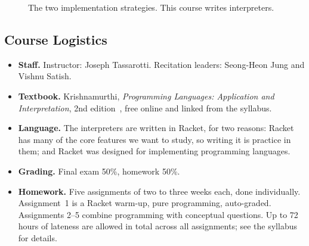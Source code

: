 \begin{figure}[htbp]
\centering
{}
\caption{The two implementation strategies. This course writes interpreters.}
\label{fig:implstrat}
\end{figure}

\subsection{Course Logistics}

\begin{itemize}
  \item \textbf{Staff.} Instructor: Joseph Tassarotti. Recitation leaders: Seong-Heon Jung and Vishnu Satish.
  \item \textbf{Textbook.} Krishnamurthi, \emph{Programming Languages: Application and Interpretation}, 2nd edition~\cite{PLAI}, free online and linked from the syllabus.
  \item \textbf{Language.} The interpreters are written in Racket, for two reasons: Racket has many of the core features we want to study, so writing it is practice in them; and Racket was designed for implementing programming languages.
  \item \textbf{Grading.} Final exam 50\%, homework 50\%.
  \item \textbf{Homework.} Five assignments of two to three weeks each, done individually. Assignment~1 is a Racket warm-up, pure programming, auto-graded. Assignments 2--5 combine programming with conceptual questions. Up to 72 hours of lateness are allowed in total across all assignments; see the syllabus for details.
\end{itemize}
